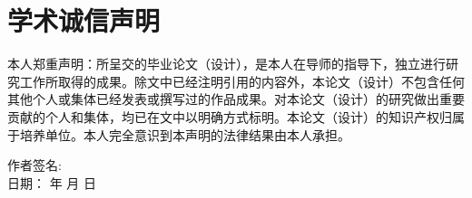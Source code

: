 \chapter*{\heiti\textbf{学术诚信声明}}
\fontsize{12}{35}\songti
	本人郑重声明：所呈交的毕业论文（设计），是本人在导师的指导下，独立进行研究工作所取得的成果。除文中已经注明引用的内容外，本论文（设计）不包含任何其他个人或集体已经发表或撰写过的作品成果。对本论文（设计）的研究做出重要贡献的个人和集体，均已在文中以明确方式标明。本论文（设计）的知识产权归属于培养单位。本人完全意识到本声明的法律结果由本人承担。\\
	
\vspace{2\baselineskip}

\hspace{15\ccwd} 作者签名:\hfill \\	

\hspace{15\ccwd} 日\quad\quad 期：\hfill \hspace{1cm} 年 \hspace{1cm} 月 \hspace{1cm} 日\\

\endinput
